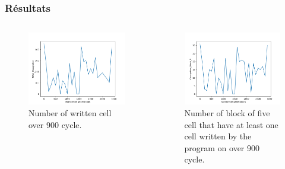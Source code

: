 \documentclass{beamer}
\begin{document}
\begin{frame}
\frametitle{Résultats}
\begin{columns}[c]
    \begin{column}{.45\textwidth}
    \begin{figure}
        \centering
        \includegraphics[width=1\textwidth]{images/Total_Occupation.png}
        \caption{Number of written cell over 900 cycle.}
    \end{figure}    
      
    \end{column}
    \begin{column}{.45\textwidth}
    \begin{figure}
        \centering
        \includegraphics[width=1\textwidth]{images/Occupation_Block_5.png}
        \caption{Number of block of five cell that have at least one cell written by the program on over 900 cycle.}
    \end{figure}
    \end{column}
\end{columns}

\end{frame}
\end{document}
